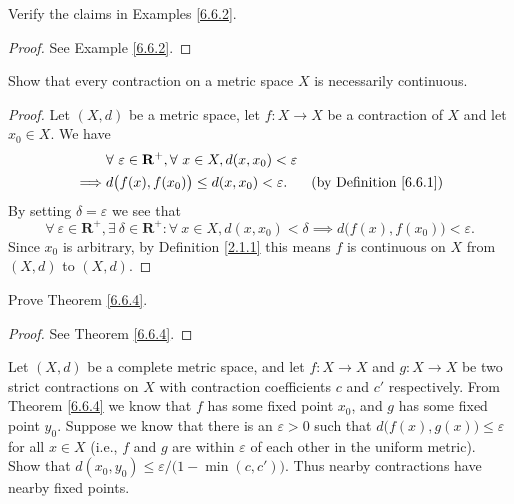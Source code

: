 \begin{exercise}\label{ex 6.6.5}
    Verify the claims in Examples \ref{6.6.2}.
\end{exercise}

\begin{proof}
    See Example \ref{6.6.2}.
\end{proof}

\begin{exercise}\label{ex 6.6.6}
    Show that every contraction on a metric space \(X\) is necessarily continuous.
\end{exercise}

\begin{proof}
    Let \((X, d)\) be a metric space, let \(f : X \to X\) be a contraction of \(X\) and let \(x_0 \in X\).
    We have
    \begin{align*}
                 & \forall\ \varepsilon \in \mathbf{R}^+, \forall\ x \in X, d(x, x_0) < \varepsilon                                      \\
        \implies & d\big(f(x), f(x_0)\big) \leq d(x, x_0) < \varepsilon.                            & \text{(by Definition \ref{6.6.1})}
    \end{align*}
    By setting \(\delta = \varepsilon\) we see that
    \[
        \forall\ \varepsilon \in \mathbf{R}^+, \exists\ \delta \in \mathbf{R}^+ : \forall\ x \in X, d(x, x_0) < \delta \implies d\big(f(x), f(x_0)\big) < \varepsilon.
    \]
    Since \(x_0\) is arbitrary, by Definition \ref{2.1.1} this means \(f\) is continuous on \(X\) from \((X, d)\) to \((X, d)\).
\end{proof}

\begin{exercise}\label{ex 6.6.7}
    Prove Theorem \ref{6.6.4}.
\end{exercise}

\begin{proof}
    See Theorem \ref{6.6.4}.
\end{proof}

\begin{exercise}\label{ex 6.6.8}
    Let \((X, d)\) be a complete metric space, and let \(f : X \to X\) and \(g : X \to X\) be two strict contractions on \(X\) with contraction coefficients \(c\) and \(c'\) respectively.
    From Theorem \ref{6.6.4} we know that \(f\) has some fixed point \(x_0\), and \(g\) has some fixed point \(y_0\).
    Suppose we know that there is an \(\varepsilon > 0\) such that \(d\big(f(x), g(x)\big) \leq \varepsilon\) for all \(x \in X\)
    (i.e., \(f\) and \(g\) are within \(\varepsilon\) of each other in the uniform metric).
    Show that \(d(x_0, y_0) \leq \varepsilon / \big(1 - \min(c, c')\big)\).
    Thus nearby contractions have nearby fixed points.
\end{exercise}

